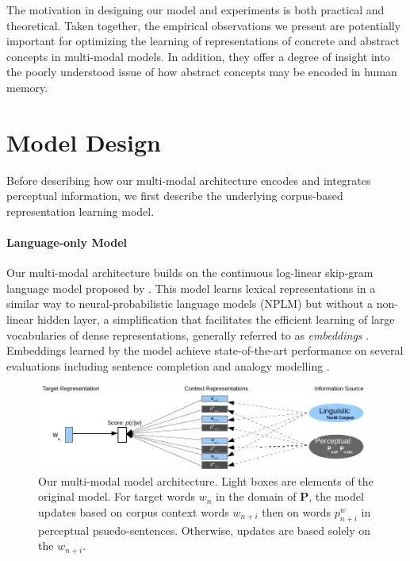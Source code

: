 \documentclass[11pt]{article}
\begin{document}
The motivation in designing our model and experiments is both practical and theoretical. Taken together, the empirical observations we present are potentially important for optimizing the learning of representations of concrete and abstract concepts in multi-modal models. In addition, they offer a degree of insight into the poorly understood issue of how abstract concepts may be encoded in human memory.    

\section{Model Design}

Before describing how our multi-modal architecture encodes and integrates perceptual information, we first describe the underlying corpus-based representation learning model. 

\paragraph{Language-only Model} Our multi-modal architecture builds on the continuous log-linear skip-gram language model proposed by . This model learns lexical representations in a similar way to neural-probabilistic language models (NPLM) but without a non-linear hidden layer, a simplification that facilitates the efficient learning of large vocabularies of dense representations, generally referred to as \emph{embeddings} \cite{turian2010word}. Embeddings learned by the model achieve state-of-the-art performance on several evaluations including sentence completion and analogy modelling \cite{mikolov2013efficient}.   

\begin{figure}[ht]  \includegraphics[width = \textwidth]{Figure_1}  \caption{Our multi-modal model architecture. Light boxes are elements of the original  model. For target words \(w_n\) in the domain of \(\mathbf{P}\), the model updates based on corpus context words \( w_{n+i} \) then on words \(p^w_{n+i}\) in perceptual psuedo-sentences. Otherwise, updates are based solely on the \( w_{n+i}. \)}\end{figure}
\end{document}

